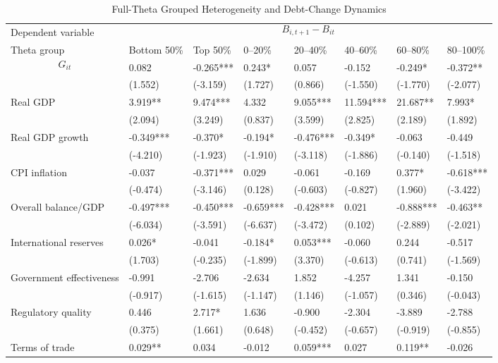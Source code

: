 \begin{table}[H]\centering
\begin{threeparttable}
\caption{Full-Theta Grouped Heterogeneity and Debt-Change Dynamics}
\label{tab:theta_group_heterogeneity_debt}
\scriptsize
\begin{tabularx}{\textwidth}{lYYYYYYY}
\toprule
Dependent variable &  \\
\cmidrule(lr){2-8}
Theta group & Bottom 50\% & Top 50\% & 0--20\% & 20--40\% & 40--60\% & 60--80\% & 80--100\% \\
\midrule
$$G_{it}$$ & 0.082 & -0.265*** & 0.243* & 0.057 & -0.152 & -0.249* & -0.372** \\
  & (1.552) & (-3.159) & (1.727) & (0.866) & (-1.550) & (-1.770) & (-2.077) \\
Real GDP & 3.919** & 9.474*** & 4.332 & 9.055*** & 11.594*** & 21.687** & 7.993* \\
  & (2.094) & (3.249) & (0.837) & (3.599) & (2.825) & (2.189) & (1.892) \\
Real GDP growth & -0.349*** & -0.370* & -0.194* & -0.476*** & -0.349* & -0.063 & -0.449 \\
  & (-4.210) & (-1.923) & (-1.910) & (-3.118) & (-1.886) & (-0.140) & (-1.518) \\
CPI inflation & -0.037 & -0.371*** & 0.029 & -0.061 & -0.169 & 0.377* & -0.618*** \\
  & (-0.474) & (-3.146) & (0.128) & (-0.603) & (-0.827) & (1.960) & (-3.422) \\
Overall balance/GDP & -0.497*** & -0.450*** & -0.659*** & -0.428*** & 0.021 & -0.888*** & -0.463** \\
  & (-6.034) & (-3.591) & (-6.637) & (-3.472) & (0.102) & (-2.889) & (-2.021) \\
International reserves & 0.026* & -0.041 & -0.184* & 0.053*** & -0.060 & 0.244 & -0.517 \\
  & (1.703) & (-0.235) & (-1.899) & (3.370) & (-0.613) & (0.741) & (-1.569) \\
Government effectiveness & -0.991 & -2.706 & -2.634 & 1.852 & -4.257 & 1.341 & -0.150 \\
  & (-0.917) & (-1.615) & (-1.147) & (1.146) & (-1.057) & (0.346) & (-0.043) \\
Regulatory quality & 0.446 & 2.717* & 1.636 & -0.900 & -2.304 & -3.889 & -2.788 \\
  & (0.375) & (1.661) & (0.648) & (-0.452) & (-0.657) & (-0.919) & (-0.855) \\
Terms of trade & 0.029** & 0.034 & -0.012 & 0.059*** & 0.027 & 0.119** & -0.026 \\

\end{tabularx}
\end{threeparttable}
\end{table}
